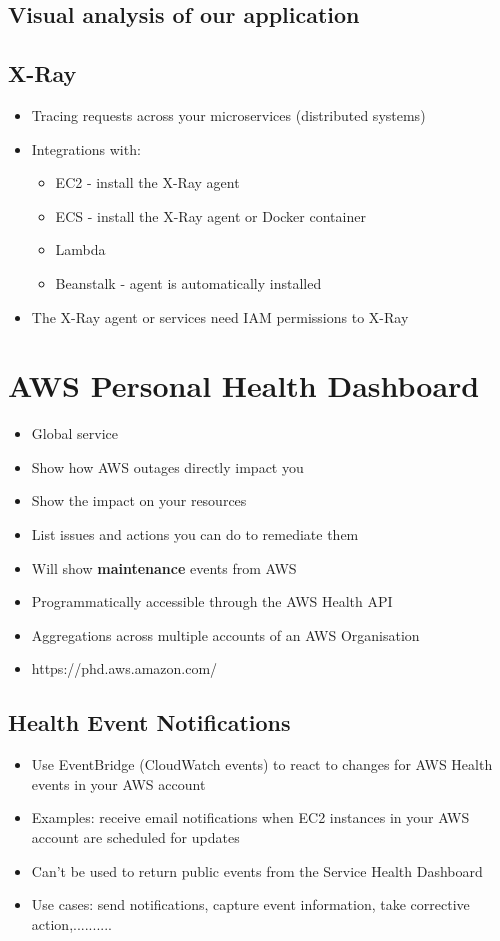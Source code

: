 \subsection{Visual analysis of our application}

\subsection{X-Ray}
\begin{itemize}
    \item Tracing requests across your microservices (distributed systems)
    \item Integrations with:
    \begin{itemize}
        \item EC2 - install the X-Ray agent
        \item ECS - install the X-Ray agent or Docker container
        \item Lambda
        \item Beanstalk - agent is automatically installed
    \end{itemize}
    \item The X-Ray agent or services need IAM permissions to X-Ray
\end{itemize}


\section{AWS Personal Health Dashboard}
\begin{itemize}
    \item Global service
    \item Show how AWS outages directly impact you
    \item Show the impact on your resources
    \item List issues and actions you can do to remediate them
    \item Will show \textbf{maintenance} events from AWS
    \item Programmatically accessible through the AWS Health API
    \item Aggregations across multiple accounts of an AWS Organisation
    \item https://phd.aws.amazon.com/
\end{itemize}

\subsection{Health Event Notifications}
\begin{itemize}
    \item Use EventBridge (CloudWatch events) to react to changes for AWS Health events in your AWS account
    \item Examples: receive email notifications when EC2 instances in your AWS account are scheduled for updates
    \item Can't be used to return public events from the Service Health Dashboard
    \item Use cases: send notifications, capture event information, take corrective action,..........
\end{itemize}
